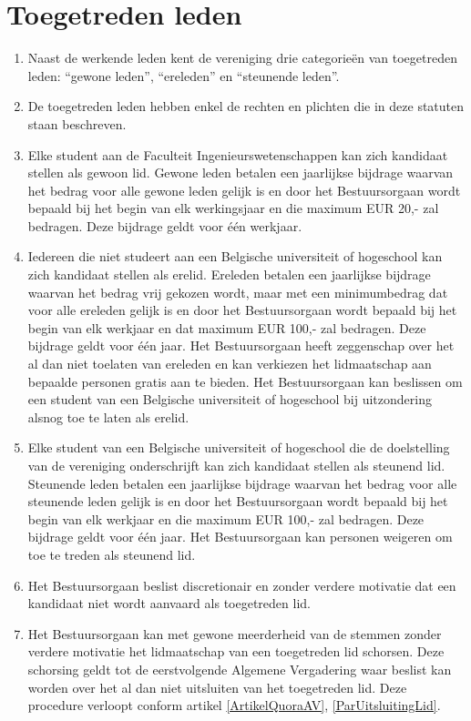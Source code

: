     \section{Toegetreden leden}
    \begin{enumerate}
    \item Naast de werkende leden kent de vereniging drie categorieën van toegetreden leden: ``gewone leden'', ``ereleden'' en ``steunende leden''.
    \item De toegetreden leden hebben enkel de rechten en plichten die in deze statuten staan beschreven.
    \item Elke student aan de Faculteit Ingenieurswetenschappen kan zich kandidaat stellen als gewoon lid. Gewone leden betalen een jaarlijkse bijdrage waarvan het bedrag voor alle gewone leden gelijk is en door het Bestuursorgaan wordt bepaald bij het begin van elk werkingsjaar en die maximum EUR 20,- zal bedragen. Deze bijdrage geldt voor één werkjaar.
    \item Iedereen die niet studeert aan een Belgische universiteit of hogeschool kan zich kandidaat stellen als erelid. Ereleden betalen een jaarlijkse bijdrage waarvan het bedrag vrij gekozen wordt, maar met een minimumbedrag dat voor alle ereleden gelijk is en door het Bestuursorgaan wordt bepaald bij het begin van elk werkjaar en dat maximum EUR 100,- zal bedragen. Deze bijdrage geldt voor één jaar. Het Bestuursorgaan heeft zeggenschap over het al dan niet toelaten van ereleden en kan verkiezen het lidmaatschap aan bepaalde personen gratis aan te bieden. Het Bestuursorgaan kan beslissen om een student van een Belgische universiteit of hogeschool bij uitzondering alsnog toe te laten als erelid.
    \item Elke student van een Belgische universiteit of hogeschool die de doelstelling van de vereniging onderschrijft kan zich kandidaat stellen als steunend lid. Steunende leden betalen een jaarlijkse bijdrage waarvan het bedrag voor alle steunende leden gelijk is en door het Bestuursorgaan wordt bepaald bij het begin van elk werkjaar en die maximum EUR 100,- zal bedragen. Deze bijdrage geldt voor één jaar. Het Bestuursorgaan kan personen weigeren om toe te treden als steunend lid.
    \item Het Bestuursorgaan beslist discretionair en zonder verdere motivatie dat een kandidaat niet wordt aanvaard als toegetreden lid.
    \item Het Bestuursorgaan kan met gewone meerderheid van de stemmen zonder verdere motivatie het lidmaatschap van een toegetreden lid schorsen.
        Deze schorsing geldt tot de eerstvolgende Algemene Vergadering waar beslist kan worden over het al dan niet uitsluiten van het toegetreden lid. Deze procedure verloopt conform artikel \ref{ArtikelQuoraAV}, \ref{ParUitsluitingLid}.
    \end{enumerate}
    
